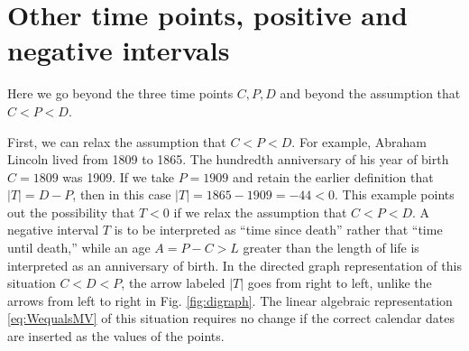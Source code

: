 \documentclass{bmcart}
\begin{document}
%

\section*{Other time points, positive and negative intervals}
Here we go beyond 
the three time points $C, P, D$ 
and beyond the assumption that $C<P<D$.

First, we can relax the assumption that $C<P<D$.
For example, Abraham Lincoln lived from 1809 to 1865.
The hundredth anniversary of his year of birth $C=1809$ was 1909.
If we take $P=1909$ and retain the earlier definition that $|T|=D-P$,
then in this case  $|T|= 1865-1909 = -44 < 0$. 
This example points out the possibility that $T<0$ if we relax the assumption that $C<P<D$.
A negative interval $T$ is to be interpreted as ``time since death'' rather that ``time until death,''
while an age $A=P-C>L$ greater than the length of life is interpreted as an anniversary of birth.
In the directed graph representation of this situation $C<D<P$, the arrow labeled $|T|$
goes from right to left, 
unlike the arrows from left to right in Fig. \ref{fig:digraph}.
The linear algebraic representation \eqref{eq:WequalsMV} of this situation requires no change
if the correct calendar dates are inserted as the values of the points.
\end{document}
